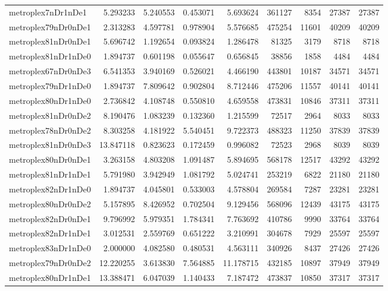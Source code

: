 \begin{longtable}{|l|r|r|r|r|r|r|r|r|}
metroplex7nDr1nDe1 & 5.293233 & 5.240553 & 0.453071 & 5.693624 & 361127 & 8354 & 27387 & 27387 \\
metroplex79nDr0nDe1 & 2.313283 & 4.597781 & 0.978904 & 5.576685 & 475254 & 11601 & 40209 & 40209 \\
metroplex81nDr0nDe1 & 5.696742 & 1.192654 & 0.093824 & 1.286478 & 81325 & 3179 & 8718 & 8718 \\
metroplex81nDr1nDe0 & 1.894737 & 0.601198 & 0.055647 & 0.656845 & 38856 & 1858 & 4484 & 4484 \\
metroplex67nDr0nDe3 & 6.541353 & 3.940169 & 0.526021 & 4.466190 & 443801 & 10187 & 34571 & 34571 \\
metroplex79nDr1nDe0 & 1.894737 & 7.809642 & 0.902804 & 8.712446 & 475206 & 11557 & 40141 & 40141 \\
metroplex80nDr1nDe0 & 2.736842 & 4.108748 & 0.550810 & 4.659558 & 473831 & 10846 & 37311 & 37311 \\
metroplex81nDr0nDe2 & 8.190476 & 1.083239 & 0.132360 & 1.215599 & 72517 & 2964 & 8033 & 8033 \\
metroplex78nDr0nDe2 & 8.303258 & 4.181922 & 5.540451 & 9.722373 & 488323 & 11250 & 37839 & 37839 \\
metroplex81nDr0nDe3 & 13.847118 & 0.823623 & 0.172459 & 0.996082 & 72523 & 2968 & 8039 & 8039 \\
metroplex80nDr0nDe1 & 3.263158 & 4.803208 & 1.091487 & 5.894695 & 568178 & 12517 & 43292 & 43292 \\
metroplex81nDr1nDe1 & 5.791980 & 3.942949 & 1.081792 & 5.024741 & 253219 & 6822 & 21180 & 21180 \\
metroplex82nDr1nDe0 & 1.894737 & 4.045801 & 0.533003 & 4.578804 & 269584 & 7287 & 23281 & 23281 \\
metroplex80nDr0nDe2 & 5.157895 & 8.426952 & 0.702504 & 9.129456 & 568096 & 12439 & 43175 & 43175 \\
metroplex82nDr0nDe1 & 9.796992 & 5.979351 & 1.784341 & 7.763692 & 410786 & 9990 & 33764 & 33764 \\
metroplex82nDr1nDe1 & 3.012531 & 2.559769 & 0.651222 & 3.210991 & 304678 & 7929 & 25597 & 25597 \\
metroplex83nDr1nDe0 & 2.000000 & 4.082580 & 0.480531 & 4.563111 & 340926 & 8437 & 27426 & 27426 \\
metroplex79nDr0nDe2 & 12.220255 & 3.613830 & 7.564885 & 11.178715 & 432185 & 10897 & 37949 & 37949 \\
metroplex80nDr1nDe1 & 13.388471 & 6.047039 & 1.140433 & 7.187472 & 473837 & 10850 & 37317 & 37317 \\

\end{longtable}
